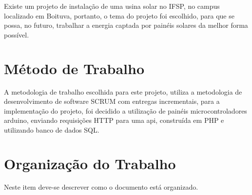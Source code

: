 Existe um projeto de instalação de uma usina solar no IFSP, no campus localizado em Boituva, portanto, o tema do projeto foi escolhido, para que se possa, no futuro, trabalhar a energia captada por painéis solares da melhor forma possível.

\section{Método de Trabalho}

A metodologia de trabalho escolhida para este projeto, utiliza a metodologia de desenvolvimento de software SCRUM com entregas incrementais, para a implementação do projeto, foi decidido a utilização de painéis microcontroladores arduino, enviando requisições HTTP para uma api, construída em PHP e utilizando banco de dados SQL.

\section{Organização do Trabalho}

Neste item deve-se descrever como o documento está organizado.


